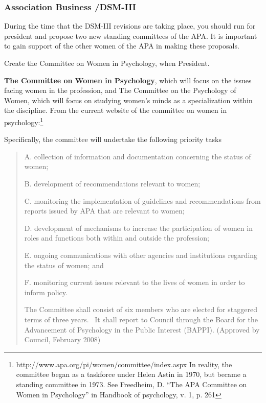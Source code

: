 \begin{refsection}
\subsubsection{Association Business \slash  DSM-III}
\label{associationbusinessdsm-iii}

During the time that the DSM-III revisions are taking place, you should run for president and propose two new standing committees of the APA. It is important to gain support of the other women of the APA in making these proposals.\begin{proposal}[Anastasi]\label{proposal:anastasiA}
Create the Committee on Women in Psychology, when President.
\end{proposal}

\textbf{The Committee on Women in Psychology}, which will focus on the issues facing women in the profession, and The Committee on the Psychology of Women, which will focus on studying women's minds as a specialization within the discipline. From the current website of the committee on women in psychology:\footnote{http:\slash \slash www.apa.org\slash pi\slash women\slash committee\slash index.aspx In reality, the committee began as a taskforce under Helen Astin in 1970, but became a standing committee in 1973. See Freedheim, D. “The APA Committee on Women in Psychology” in Handbook of psychology, v. 1, p. 261}

Specifically, the committee will undertake the following priority tasks

\begin{quote}

A. collection of information and documentation concerning the status of women;

B. development of recommendations relevant to women;

C. monitoring the implementation of guidelines and recommendations from reports issued by APA that are relevant to women;

D. development of mechanisms to increase the participation of women in roles and functions both within and outside the profession;

E. ongoing communications with other agencies and institutions regarding the status of women; and

F. monitoring current issues relevant to the lives of women in order to inform policy.

The Committee shall consist of six members who are elected for staggered terms of three years.  It shall report to Council through the Board for the Advancement of Psychology in the Public Interest (BAPPI). (Approved by Council, February 2008)


\end{quote}
\end{refsection}
